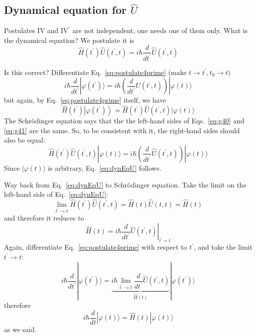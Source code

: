 \documentclass[12pt]{article}
\begin{document}
\subsection{Dynamical equation for $\hat{U}$}

Postulates IV and IV$^\prime$ are not independent, one needs
one of them only. What is the dynamical equation?
We postulate it is
\begin{equation}
\boxed{
\hat{H}\left(t^{\prime}\right) \hat{U}\left(t^{\prime}, t\right)=i \hbar \frac{d}{d t^{\prime}} \hat{U}\left(t^{\prime}, t\right)
}
\label{eq:dynEqU}
\end{equation}

Is this correct? Differentiate Eq.~\ref{eq:postulate4prime} (make $t \to t^\prime, t_0\to t)$
\begin{equation}
i \hbar \frac{d}{d t^\prime}|\varphi(t^\prime)\rangle =
i \hbar\left(\frac{d}{d t^\prime} \hat{U}\left(t^{\prime},t\right) \right) |\varphi(t)\rangle	
\label{eq:g40}
\end{equation}
but again, by Eq.~\ref{eq:postulate4prime} itself, we have
\begin{equation}
\hat{H}\left(t^{\prime}\right)\left|\varphi\left(t^{\prime}\right)\right\rangle=
\hat{H}(t^\prime) \hat{U}\left(t^{\prime}, t\right)|\varphi(t)\rangle
\label{eq:g41}
\end{equation}
The Schrödinger equation says that the the left-hand sides of Eqs.~\ref{eq:g40} and \ref{eq:g41} are the same.
So, to be consistent with it, the right-hand sides should also be equal:
\[
\hat{H}(t^\prime) \hat{U}\left(t^{\prime}, t\right)|\varphi(t)\rangle = 
i \hbar\left(\frac{d}{d t^\prime} \hat{U}\left(t^{\prime},t\right) \right) |\varphi(t)\rangle
\]
Since $|\varphi(t)\rangle$ is arbitrary, Eq.~\ref{eq:dynEqU} follows.


Way back from Eq.~\ref{eq:dynEqU} to Schrödinger equation. Take the limit on the left-hand side of Eq.~\ref{eq:dynEqU}:
\[
\lim _{t^{\prime} \rightarrow t} 
\hat{H} (t^{\prime}) \hat{U}(t^{\prime}, t)=\hat{H}(t) \hat{U}(t, t)=\hat{H}(t)
\]
and therefore it reduces to
\begin{equation}
\hat{H}(t)=\left.i \hbar \frac{d}{d t^{\prime}} \hat{U}\left(t^{\prime}, t\right)\right|_{t^{\prime}=t}
\label{eq:g42}
\end{equation}
Again, differentiate Eq.~\ref{eq:postulate4prime} with respect to $t^\prime$, and take the limit $t^\prime \to t$:
\begin{equation}
i \hbar \frac{d}{d t^\prime}|\varphi(t^\prime)\rangle = 
\underbrace{i \hbar \lim _{t^{\prime} \rightarrow t} \frac{d}{d t^{\prime}} \hat{U}\left(t^{\prime}, t\right)}%
_{\hat{H}(t)}%
|\varphi(t^\prime)\rangle
\end{equation}
therefore
\[
i \hbar \frac{d}{d t}|\varphi(t)\rangle=\hat{H}(t)|\varphi(t)\rangle
\]
as we said.
\end{document}
